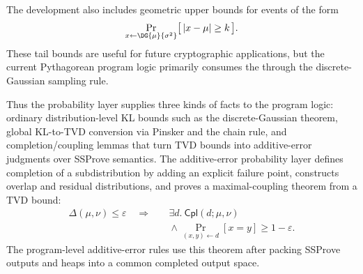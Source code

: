 The development also includes geometric upper bounds for events of the form
\[
  \Pr_{x\gets\DG{\mu}{\sigma^2}}
    \bigl[\, |x-\mu|\geq k\,\bigr].
\]
These tail bounds are useful for future cryptographic applications, but the current Pythagorean program logic primarily consumes the  through the discrete-Gaussian sampling rule.

Thus the probability layer supplies three kinds of facts to the program logic:
ordinary distribution-level KL bounds such as the discrete-Gaussian theorem,
global KL-to-TVD conversion via Pinsker and the chain rule,
and completion/coupling lemmas that turn TVD bounds into additive-error
judgments over SSProve semantics.
The additive-error probability layer defines completion of a subdistribution
by adding an explicit failure point, constructs overlap and residual
distributions, and proves a maximal-coupling theorem from a TVD bound:
\begin{align*}
  \Delta(\mu,\nu)\leq \varepsilon
  \quad\Longrightarrow\quad&
  \exists d.\ \mathsf{Cpl}(d;\mu,\nu)\\
  &{}\wedge
  \Pr_{(x,y)\gets d}[x=y]\geq 1-\varepsilon .
\end{align*}
The program-level additive-error rules use this theorem after packing SSProve
outputs and heaps into a common completed output space.

